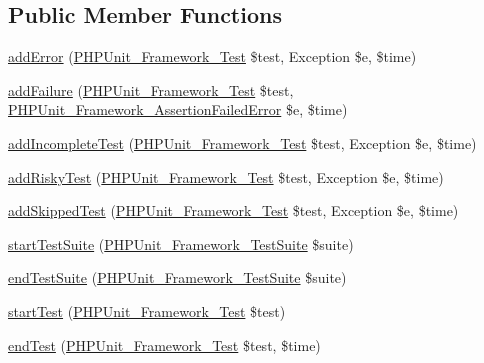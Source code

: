 \subsection*{Public Member Functions}
\begin{DoxyCompactItemize}
\item 
\mbox{\hyperlink{class_p_h_p_unit___extensions___ticket_listener_a320d7bc7d2f9264ee7ba7aca6fd2df41}{add\+Error}} (\mbox{\hyperlink{interface_p_h_p_unit___framework___test}{P\+H\+P\+Unit\+\_\+\+Framework\+\_\+\+Test}} \$test, Exception \$e, \$time)
\item 
\mbox{\hyperlink{class_p_h_p_unit___extensions___ticket_listener_a668f17b68705c5c8686bac690a6f719d}{add\+Failure}} (\mbox{\hyperlink{interface_p_h_p_unit___framework___test}{P\+H\+P\+Unit\+\_\+\+Framework\+\_\+\+Test}} \$test, \mbox{\hyperlink{class_p_h_p_unit___framework___assertion_failed_error}{P\+H\+P\+Unit\+\_\+\+Framework\+\_\+\+Assertion\+Failed\+Error}} \$e, \$time)
\item 
\mbox{\hyperlink{class_p_h_p_unit___extensions___ticket_listener_a81bfe09a62194fe5769ca1cc36ee428b}{add\+Incomplete\+Test}} (\mbox{\hyperlink{interface_p_h_p_unit___framework___test}{P\+H\+P\+Unit\+\_\+\+Framework\+\_\+\+Test}} \$test, Exception \$e, \$time)
\item 
\mbox{\hyperlink{class_p_h_p_unit___extensions___ticket_listener_ad161e7d13b117cb0af3967cd2adc6bba}{add\+Risky\+Test}} (\mbox{\hyperlink{interface_p_h_p_unit___framework___test}{P\+H\+P\+Unit\+\_\+\+Framework\+\_\+\+Test}} \$test, Exception \$e, \$time)
\item 
\mbox{\hyperlink{class_p_h_p_unit___extensions___ticket_listener_a1c0cb3bc58e5807530daf3a93783ed4e}{add\+Skipped\+Test}} (\mbox{\hyperlink{interface_p_h_p_unit___framework___test}{P\+H\+P\+Unit\+\_\+\+Framework\+\_\+\+Test}} \$test, Exception \$e, \$time)
\item 
\mbox{\hyperlink{class_p_h_p_unit___extensions___ticket_listener_a901a86a623d83184267b21f2daee0ff5}{start\+Test\+Suite}} (\mbox{\hyperlink{class_p_h_p_unit___framework___test_suite}{P\+H\+P\+Unit\+\_\+\+Framework\+\_\+\+Test\+Suite}} \$suite)
\item 
\mbox{\hyperlink{class_p_h_p_unit___extensions___ticket_listener_aeec28a4d1328434916ebcdc1ca6b5527}{end\+Test\+Suite}} (\mbox{\hyperlink{class_p_h_p_unit___framework___test_suite}{P\+H\+P\+Unit\+\_\+\+Framework\+\_\+\+Test\+Suite}} \$suite)
\item 
\mbox{\hyperlink{class_p_h_p_unit___extensions___ticket_listener_a1a9bddc54f26bb3fb5c2ec9778ea5198}{start\+Test}} (\mbox{\hyperlink{interface_p_h_p_unit___framework___test}{P\+H\+P\+Unit\+\_\+\+Framework\+\_\+\+Test}} \$test)
\item 
\mbox{\hyperlink{class_p_h_p_unit___extensions___ticket_listener_a6de65eea8b294795cbc34c4c8cee8546}{end\+Test}} (\mbox{\hyperlink{interface_p_h_p_unit___framework___test}{P\+H\+P\+Unit\+\_\+\+Framework\+\_\+\+Test}} \$test, \$time)
\end{DoxyCompactItemize}
